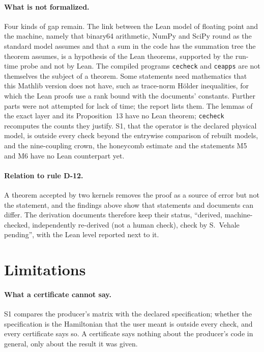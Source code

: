\documentclass[11pt,a4paper]{article}
\newcommand{\code}[1]{\texttt{#1}}
\begin{document}
\paragraph{What is not formalized.}
Four kinds of gap remain. The link between the Lean model of floating point and the machine, namely that binary64
arithmetic, NumPy and SciPy round as the standard model assumes and that a sum in the code has the summation tree the
theorem assumes, is a hypothesis of the Lean theorems, supported by the run-time probe and not by Lean. The compiled
programs \code{cecheck} and \code{ceapps} are not themselves the subject of a theorem. Some statements need
mathematics that this Mathlib version does not have, such as trace-norm H\"older inequalities, for which the Lean
proofs use a rank bound with the documents' constants. Further parts were not attempted for lack of time; the report
lists them. The lemmas of the exact layer and its Proposition~13 have no Lean theorem; \code{cecheck} recomputes the
counts they justify. S1, that the operator is the declared physical model, is outside every check beyond the
entrywise comparison of rebuilt models, and the nine-coupling crown, the honeycomb estimate and the statements M5 and
M6 have no Lean counterpart yet.

\paragraph{Relation to rule D-12.}
A theorem accepted by two kernels removes the proof as a source of error but not the statement, and the findings above
show that statements and documents can differ. The derivation documents therefore keep their status, ``derived,
machine-checked, independently re-derived (not a human check), check by S.~Vehale pending'', with the Lean level
reported next to it.

\section{Limitations}
\label{sec:limits}

\paragraph{What a certificate cannot say.}
S1 compares the producer's matrix with the declared specification; whether the specification is the Hamiltonian that
the user meant is outside every check, and every certificate says so. A certificate says nothing about the producer's
code in general, only about the result it was given.
\end{document}
